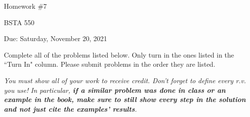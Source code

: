 \documentclass[12pt]{article}
\begin{document}
\begin{center}

Homework \#7

BSTA 550

Due: Saturday, November 20, 2021 

%

%
\bigskip



\end{center}


\bigskip

Complete all of the problems listed below. \newline 
Only turn in the ones listed in the ``Turn In" column. \newline
Please submit problems in the order they are listed.

\bigskip

\textit{You must show all of your work to receive credit. Don't forget to define every r.v. you use!}  \newline 
\textit{In particular, \textbf{if a similar problem was done in class or an example in the book, make sure to still show every step in the solution and not just cite the examples' results}.}  \newline 



\end{document}
